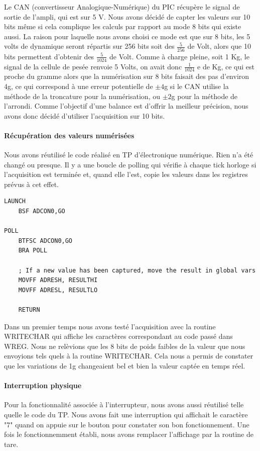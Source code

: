 \documentclass[a4paper,11pt,titlepage]{article}
\begin{document}
Le CAN (convertisseur Analogique-Numérique) du PIC récupère le signal de sortie de l'ampli, qui est sur 5 V. Nous avons décidé de capter les valeurs sur 10 bits même si cela complique les calculs par rapport au mode 8 bits qui existe aussi. La raison pour laquelle nous avons choisi ce mode est que sur 8 bits, les 5 volts de dynamique seront répartis sur 256 bits soit des $\frac{5}{256}$ de Volt, alors que 10 bits permettent d'obtenir des $\frac{5}{1024}$ de Volt. Comme à charge pleine, soit 1 Kg, le signal de la cellule de pesée renvoie 5 Volts, on avait donc $\frac{1}{1024}$ e de Kg, ce qui est proche du gramme alors que la numérisation sur 8 bits faisait des pas d'environ 4g, ce qui correspond à une erreur potentielle de $\pm 4$g si le CAN utilise la méthode de la troncature pour la numérisation, ou $\pm 2$g pour la méthode de l'arrondi. Comme l'objectif d'une balance est d'offrir la meilleur précision, nous avons donc décidé d'utiliser l'acquisition sur 10 bits.

\paragraph{Récupération des valeurs numérisées}
Nous avons réutilisé le code réalisé en TP d'électronique numérique. Rien n'a été changé ou presque. 
Il y a une boucle de polling qui vérifie à chaque tick horloge si l'acquisition est terminée et, quand elle l'est, copie les valeurs dans les registres prévus à cet effet. \\
\begin{lstlisting}
LAUNCH
    BSF ADCON0,GO
    
POLL
    BTFSC ADCON0,GO
    BRA POLL
    
    ; If a new value has been captured, move the result in global vars
    MOVFF ADRESH, RESULTHI
    MOVFF ADRESL, RESULTLO
    
    RETURN 
\end{lstlisting}

Dans un premier temps nous avons testé l'acquisition avec la routine WRITECHAR qui affiche les caractères correspondant au code passé dans WREG. Nous ne relèvions que les 8 bits de poids faibles de la valeur que nous envoyions tels quels à la routine WRITECHAR. Cela nous a permis de constater que les variations de 1g changeaient bel et bien la valeur captée en temps réel.

\paragraph{Interruption physique}
Pour la fonctionnalité associée à l'interrupteur, nous avons aussi réutilisé telle quelle le code du TP. Nous avons fait une interruption qui affichait le caractère "7" quand on appuie sur le bouton pour constater son bon fonctionnement. Une fois le fonctionnemment établi, nous avons remplacer l'affichage par la routine de tare.
\end{document}
